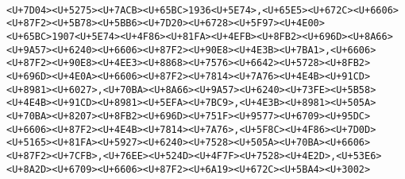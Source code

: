 \documentclass[
]{article}
\begin{document}
\begin{verbatim}
                                                                                                                                                                                                                                                                                                                                                                                                                                                                                                                                                                                                       <U+7D04><U+5275><U+7ACB><U+65BC>1936<U+5E74>,<U+65E5><U+672C><U+6606><U+87F2><U+5B78><U+5BB6><U+7D20><U+6728><U+5F97><U+4E00><U+65BC>1907<U+5E74><U+4F86><U+81FA><U+4EFB><U+8FB2><U+696D><U+8A66><U+9A57><U+6240><U+6606><U+87F2><U+90E8><U+4E3B><U+7BA1>,<U+6606><U+87F2><U+90E8><U+4EE3><U+8868><U+7576><U+6642><U+5728><U+8FB2><U+696D><U+4E0A><U+6606><U+87F2><U+7814><U+7A76><U+4E4B><U+91CD><U+8981><U+6027>,<U+70BA><U+8A66><U+9A57><U+6240><U+73FE><U+5B58><U+4E4B><U+91CD><U+8981><U+5EFA><U+7BC9>,<U+4E3B><U+8981><U+505A><U+70BA><U+8207><U+8FB2><U+696D><U+751F><U+9577><U+6709><U+95DC><U+6606><U+87F2><U+4E4B><U+7814><U+7A76>,<U+5F8C><U+4F86><U+7D0D><U+5165><U+81FA><U+5927><U+6240><U+7528><U+505A><U+70BA><U+6606><U+87F2><U+7CFB>,<U+76EE><U+524D><U+4F7F><U+7528><U+4E2D>,<U+53E6><U+8A2D><U+6709><U+6606><U+87F2><U+6A19><U+672C><U+5BA4><U+3002>

\end{verbatim}
\end{document}
